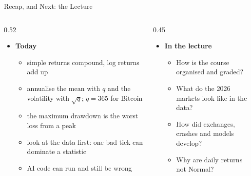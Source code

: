\begin{frame}{Recap, and Next: the  Lecture}
\itemsize{\small}
\begin{columns}[T]
\begin{column}{0.52\textwidth}
\begin{itemize}
    \item \textbf{Today}
    \begin{itemize}
        \item simple returns compound, log returns add up
        \item annualise the mean with $q$ and the volatility with $\sqrt{q}$; $q = 365$ for Bitcoin
        \item the maximum drawdown is the worst loss from a peak
        \item look at the data first: one bad tick can dominate a statistic
        \item AI code can run and still be wrong
    \end{itemize}
\end{itemize}
\end{column}
\begin{column}{0.45\textwidth}
\begin{itemize}
    \item \textbf{In the lecture}
    \begin{itemize}
        \item How is the course organised and graded?
        \item What do the 2026 markets look like in the data?
        \item How did exchanges, crashes and models develop?
        \item Why are daily returns not Normal?
    \end{itemize}
\end{itemize}
\end{column}
\end{columns}
\end{frame}


